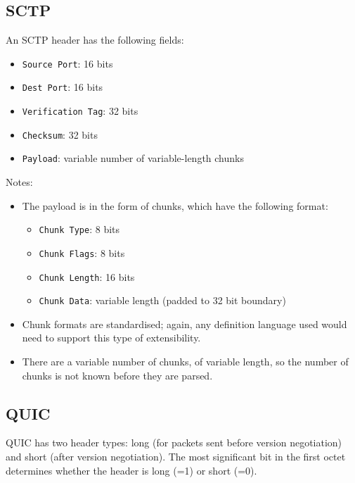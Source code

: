 \documentclass[10pt,a4paper]{article}
\begin{document}
\subsection{SCTP}

An SCTP header has the following fields:
\begin{itemize}
\item \texttt{Source Port}: 16 bits
\item \texttt{Dest Port}: 16 bits
\item \texttt{Verification Tag}: 32 bits
\item \texttt{Checksum}: 32 bits
\item \texttt{Payload}: variable number of variable-length chunks
\end{itemize}

Notes:
\begin{itemize}
\item The payload is in the form of chunks, which have the following format:
\begin{itemize}
\item \texttt{Chunk Type}: 8 bits
\item \texttt{Chunk Flags}: 8 bits
\item \texttt{Chunk Length}: 16 bits
\item \texttt{Chunk Data}: variable length (padded to 32 bit boundary)
\end{itemize}
\item Chunk formats are standardised; again, any definition language used would need to
support this type of extensibility. 
\item There are a variable number of chunks, of variable length, so the number of chunks
is not known before they are parsed.
\end{itemize}

\subsection{QUIC}

QUIC has two header types: long (for packets sent before version negotiation) and short
(after version negotiation). The most significant bit in the first octet determines
whether the header is long (=1) or short (=0).
\end{document}
